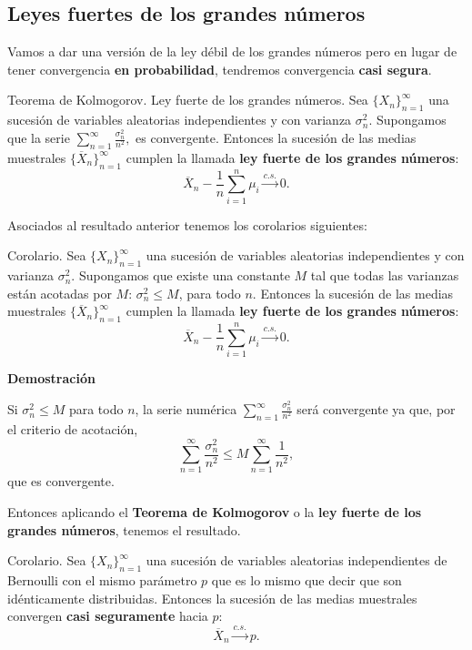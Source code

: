 \documentclass[]{book}
\begin{document}
\hypertarget{leyes-fuertes-de-los-grandes-nuxfameros}{%
\subsection{Leyes fuertes de los grandes números}\label{leyes-fuertes-de-los-grandes-nuxfameros}}

Vamos a dar una versión de la ley débil de los grandes números pero en lugar de tener convergencia \textbf{en probabilidad}, tendremos convergencia \textbf{casi segura}.

 Teorema de Kolmogorov. Ley fuerte de los grandes números.
Sea \(\{X_n\}_{n=1}^\infty\) una sucesión de variables aleatorias independientes y con varianza \(\sigma_n^2\). Supongamos que la serie
\(\sum\limits_{n=1}^\infty \frac{\sigma_n^2}{n^2},\)
es convergente. Entonces la sucesión de las medias muestrales \(\{\overline{X}_n\}_{n=1}^\infty\) cumplen la
llamada \textbf{ley fuerte de los grandes números}:
\[
\overline{X}_n-\frac{1}{n}\sum_{i=1}^n \mu_i \stackrel{c.s.}{\longrightarrow} 0.
\]

Asociados al resultado anterior tenemos los corolarios siguientes:

 Corolario.
Sea \(\{X_n\}_{n=1}^\infty\) una sucesión de variables aleatorias independientes y con varianza \(\sigma_n^2\). Supongamos que existe una constante \(M\) tal que todas las varianzas están acotadas por \(M\): \(\sigma_n^2\leq M\), para todo \(n\).
Entonces la sucesión de las medias muestrales \(\{\overline{X}_n\}_{n=1}^\infty\) cumplen la
llamada \textbf{ley fuerte de los grandes números}:
\[
\overline{X}_n-\frac{1}{n}\sum_{i=1}^n \mu_i \stackrel{c.s.}{\longrightarrow} 0.
\]

\textbf{Demostración}

Si \(\sigma_n^2\leq M\) para todo \(n\), la serie numérica \(\sum\limits_{n=1}^\infty \frac{\sigma_n^2}{n^2}\) será convergente ya que, por el criterio de acotación,
\[
\sum\limits_{n=1}^\infty \frac{\sigma_n^2}{n^2}\leq M\sum\limits_{n=1}^\infty \frac{1}{n^2},
\]
que es convergente.

Entonces aplicando el \textbf{Teorema de Kolmogorov} o la \textbf{ley fuerte de los grandes números}, tenemos el resultado.

 Corolario.
Sea \(\{X_n\}_{n=1}^\infty\) una sucesión de variables aleatorias independientes de Bernoulli con el mismo parámetro \(p\) que es lo mismo que decir que son idénticamente distribuidas.
Entonces la sucesión de las medias muestrales convergen \textbf{casi seguramente} hacia \(p\):
\[
\overline{X}_n \stackrel{c.s.}{\longrightarrow} p.
\]
\end{document}
